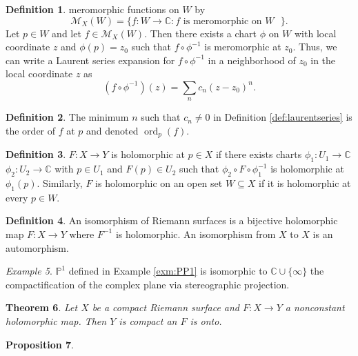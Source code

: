 \documentclass{dcthesis}
\newcommand{\PP}{\mathbb P}
\newcommand{\CC}{\mathbb C}
\newcommand{\defi}[1]{\textsf{#1}}
\DeclareMathOperator{\ord}{ord}
\newtheorem{prop}{Proposition}[section]
\newtheorem{theorem}[prop]{Theorem}
\theoremstyle{definition}
\newtheorem{definition}[prop]{Definition}
\theoremstyle{remark}
\newtheorem{example}[prop]{Example}
\numberwithin{equation}{section}
\numberwithin{figure}{section}
\begin{document}
{{\begin{definition}
      meromorphic functions on $W$ by
      \[
        \mathcal{M}_X(W)
        =
        \{f\colon W\to\CC : f\text{ is meromorphic on $W$ }\}.
      \]
      Let $p\in W$ and
      let $f\in\mathcal{M}_X(W)$.
      Then there exists a chart $\phi$ on $W$
      with local coordinate $z$
      and
      $\phi(p) = z_0$
      such that $f\circ\phi^{-1}$ is meromorphic at $z_0$.
      Thus,
      we can write a \defi{Laurent series expansion
      for $f\circ\phi^{-1}$}
      in a neighborhood of $z_0$
      in the local coordinate $z$
      as
      \[
        (f\circ\phi^{-1})(z) = \sum_{n}c_n(z-z_0)^n.
      \]
    \end{definition}
    \begin{definition}
      \label{def:ord}
      The minimum $n$ such that $c_n\neq 0$
      in Definition \ref{def:laurentseries}
      is the \defi{order of $f$ at $p$}
      and denoted
      $\ord_p(f)$.
    \end{definition}
    \begin{definition}
      \label{ref:holomorphicmapofRS}
      $F\colon X\to Y$ is
      \defi{holomorphic}
      at $p\in X$
      if there exists
      charts
      $\phi_1\colon U_1\to\CC$
      $\phi_2\colon U_2\to\CC$
      with $p\in U_1$ and $F(p)\in U_2$
      such that
      $\phi_2\circ F\circ\phi_1^{-1}$
      is holomorphic at $\phi_1(p)$.
      Similarly,
      $F$ is \defi{holomorphic on an open set $W\subseteq X$}
      if it is holomorphic at every $p\in W$.
    \end{definition}
    \begin{definition}
      \label{def:RSautoiso}
      An \defi{isomorphism} of Riemann surfaces is
      a bijective holomorphic map $F\colon X\to Y$
      where $F^{-1}$ is holomorphic.
      An isomorphism from $X$ to $X$ is
      an \defi{automorphism}.
    \end{definition}
    \begin{example}
      \label{exm:PP1isoCCoo}
      $\PP^1$ defined in Example
      \ref{exm:PP1}
      is isomorphic to $\CC\cup \{\infty\}$
      the compactification of the complex plane
      via stereographic projection.
    \end{example}
    \begin{theorem}
      \label{thm:compactonto}
      Let $X$ be a compact Riemann surface
      and $F\colon X\to Y$
      a nonconstant holomorphic map.
      Then $Y$ is compact an $F$ is onto.
    \end{theorem}
    \begin{prop}

\end{prop}}}
\end{document}
